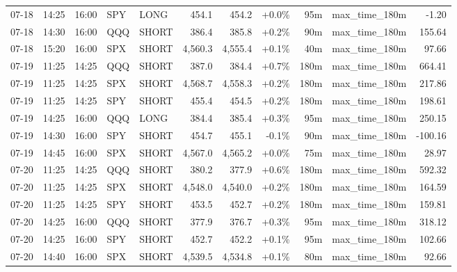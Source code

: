 \documentclass[11pt,a4paper,twoside]{article}
\begin{document}
\begin{center}
\begin{longtable}{>{\color{txtmain}}l l l l l r r r r >{\color{txtmain}}l r}
07-18 & 14:25 & 16:00 & SPY & LONG & 454.1 & 454.2 & \textcolor{wingreen}{+0.0\%} & 95m & max\_time\_180m & \textcolor{lossred}{-1.20} \\
07-18 & 14:30 & 16:00 & QQQ & SHORT & 386.4 & 385.8 & \textcolor{wingreen}{+0.2\%} & 90m & max\_time\_180m & \textcolor{wingreen}{155.64} \\
07-18 & 15:20 & 16:00 & SPX & SHORT & 4,560.3 & 4,555.4 & \textcolor{wingreen}{+0.1\%} & 40m & max\_time\_180m & \textcolor{wingreen}{97.66} \\
07-19 & 11:25 & 14:25 & QQQ & SHORT & 387.0 & 384.4 & \textcolor{wingreen}{+0.7\%} & 180m & max\_time\_180m & \textcolor{wingreen}{664.41} \\
07-19 & 11:25 & 14:25 & SPX & SHORT & 4,568.7 & 4,558.3 & \textcolor{wingreen}{+0.2\%} & 180m & max\_time\_180m & \textcolor{wingreen}{217.86} \\
07-19 & 11:25 & 14:25 & SPY & SHORT & 455.4 & 454.5 & \textcolor{wingreen}{+0.2\%} & 180m & max\_time\_180m & \textcolor{wingreen}{198.61} \\
07-19 & 14:25 & 16:00 & QQQ & LONG & 384.4 & 385.4 & \textcolor{wingreen}{+0.3\%} & 95m & max\_time\_180m & \textcolor{wingreen}{250.15} \\
07-19 & 14:30 & 16:00 & SPY & SHORT & 454.7 & 455.1 & \textcolor{lossred}{-0.1\%} & 90m & max\_time\_180m & \textcolor{lossred}{-100.16} \\
07-19 & 14:45 & 16:00 & SPX & SHORT & 4,567.0 & 4,565.2 & \textcolor{wingreen}{+0.0\%} & 75m & max\_time\_180m & \textcolor{wingreen}{28.97} \\
07-20 & 11:25 & 14:25 & QQQ & SHORT & 380.2 & 377.9 & \textcolor{wingreen}{+0.6\%} & 180m & max\_time\_180m & \textcolor{wingreen}{592.32} \\
07-20 & 11:25 & 14:25 & SPX & SHORT & 4,548.0 & 4,540.0 & \textcolor{wingreen}{+0.2\%} & 180m & max\_time\_180m & \textcolor{wingreen}{164.59} \\
07-20 & 11:25 & 14:25 & SPY & SHORT & 453.5 & 452.7 & \textcolor{wingreen}{+0.2\%} & 180m & max\_time\_180m & \textcolor{wingreen}{159.81} \\
07-20 & 14:25 & 16:00 & QQQ & SHORT & 377.9 & 376.7 & \textcolor{wingreen}{+0.3\%} & 95m & max\_time\_180m & \textcolor{wingreen}{318.12} \\
07-20 & 14:25 & 16:00 & SPY & SHORT & 452.7 & 452.2 & \textcolor{wingreen}{+0.1\%} & 95m & max\_time\_180m & \textcolor{wingreen}{102.66} \\
07-20 & 14:40 & 16:00 & SPX & SHORT & 4,539.5 & 4,534.8 & \textcolor{wingreen}{+0.1\%} & 80m & max\_time\_180m & \textcolor{wingreen}{92.66} \\

\end{longtable}
\end{center}
\end{document}
